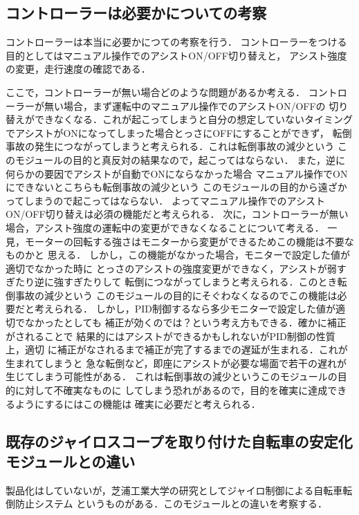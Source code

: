 \documentclass[uplatex,dvipdfmx]{jsarticle}
\begin{document}
\subsection{コントローラーは必要かについての考察}

コントローラーは本当に必要かにつての考察を行う．
コントローラーをつける目的としてはマニュアル操作でのアシストON/OFF切り替えと，
アシスト強度の変更，走行速度の確認である．

ここで，コントローラーが無い場合どのような問題があるか考える．
コントローラーが無い場合，まず運転中のマニュアル操作でのアシストON/OFFの
切り替えができなくなる．これが起こってしまうと自分の想定していないタイミング
でアシストがONになってしまった場合とっさにOFFにすることができず，
転倒事故の発生につながってしまうと考えられる．これは転倒事故の減少という
このモジュールの目的と真反対の結果なので，起こってはならない．
また，逆に何らかの要因でアシストが自動でONにならなかった場合
マニュアル操作でONにできないとこちらも転倒事故の減少という
このモジュールの目的から遠ざかってしまうので起こってはならない．
よってマニュアル操作でのアシストON/OFF切り替えは必須の機能だと考えられる．
次に，コントローラーが無い場合，アシスト強度の運転中の変更ができなくなることについて考える．
一見，モーターの回転する強さはモニターから変更ができるためこの機能は不要なものかと
思える．
しかし，この機能がなかった場合，モニターで設定した値が適切でなかった時に
とっさのアシストの強度変更ができなく，アシストが弱すぎたり逆に強すぎたりして
転倒につながってしまうと考えられる．このとき転倒事故の減少という
このモジュールの目的にそぐわなくなるのでこの機能は必要だと考えられる．
しかし，PID制御するなら多少モニターで設定した値が適切でなかったとしても
補正が効くのでは？という考え方もできる．確かに補正がされることで
結果的にはアシストができるかもしれないがPID制御の性質上，適切
に補正がなされるまで補正が完了するまでの遅延が生まれる．これが生まれてしまうと
急な転倒など，即座にアシストが必要な場面で若干の遅れが生じてしまう可能性がある．
これは転倒事故の減少というこのモジュールの目的に対して不確実なものに
してしまう恐れがあるので，目的を確実に達成できるようにするにはこの機能は
確実に必要だと考えられる．

\subsection{既存のジャイロスコープを取り付けた自転車の安定化モジュールとの違い}
製品化はしていないが，芝浦工業大学の研究としてジャイロ制御による自転車転倒防止システム
というものがある．このモジュールとの違いを考察する．
\end{document}
